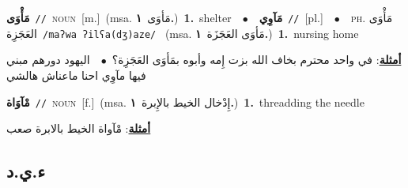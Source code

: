 \documentclass[10pt,a4paper,twoside]{article} %
\begin{document}
\begin{multicols}{2}
{\setlength\topsep{0pt}\textbf{\foreignlanguage{arabic}{مَأْوَى}}\ {\color{gray}\texttt{//}\color{black}}\ \textsc{noun}\ [m.]\ \color{gray}(msa. \foreignlanguage{arabic}{مَأوَى}~\foreignlanguage{arabic}{\textbf{١.}})\color{black}\ \textbf{1.}~shelter\ \ $\bullet$\ \ \setlength\topsep{0pt}\textbf{\foreignlanguage{arabic}{مَآوِي}}\ {\color{gray}\texttt{//}\color{black}}\ [pl.]\ \ $\bullet$\ \ \textsc{ph.} \color{gray} \foreignlanguage{arabic}{مَأْوَى العَجَزِة}\color{black}\ {\color{gray}\texttt{/{\sffamily maʔwa ʔilʕa(dʒ)aze}/}\color{black}}\ \color{gray} (msa. \foreignlanguage{arabic}{مَأوَى العَجَزَة}~\foreignlanguage{arabic}{\textbf{١.}})\color{black}\ \textbf{1.}~nursing home\  \begin{flushright}\color{gray}\foreignlanguage{arabic}{\textbf{\underline{\foreignlanguage{arabic}{أمثلة}}}: في واحد محترم بخاف الله بزت إِمه وأبوه بمَأوَى العَجَزِة؟\ $\bullet$\ \  اليهود دورهم مبني فيها مآوِي احنا ماعناش هالشي}\end{flushright}\color{black}} \vspace{2mm}

{\setlength\topsep{0pt}\textbf{\foreignlanguage{arabic}{مْآوَاة}}\ {\color{gray}\texttt{//}\color{black}}\ \textsc{noun}\ [f.]\ \color{gray}(msa. \foreignlanguage{arabic}{إِدْخال الخيط بالإِبرة}~\foreignlanguage{arabic}{\textbf{١.}})\color{black}\ \textbf{1.}~threadding the needle\  \begin{flushright}\color{gray}\foreignlanguage{arabic}{\textbf{\underline{\foreignlanguage{arabic}{أمثلة}}}: مْآواة الخيط بالابرة صعب}\end{flushright}\color{black}} \vspace{2mm}

\vspace{-3mm}
\subsection*{\color{blue}\foreignlanguage{arabic}{ء.ي.د}\color{blue}{}} 


\end{multicols}
\end{document}
